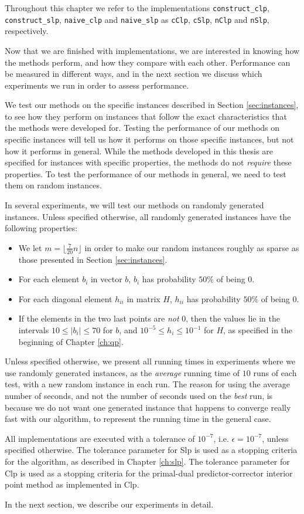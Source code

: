 Throughout this chapter we refer to the implementations \texttt{construct\_clp},
\texttt{construct\_slp}, \texttt{naive\_clp} and \texttt{naive\_slp} as
\texttt{cClp}, \texttt{cSlp}, \texttt{nClp} and \texttt{nSlp}, respectively.

Now that we are finished with implementations, we are interested in knowing
how the methods perform, and how they compare with each other.
Performance can be measured in different ways, and in the next section we
discuss which experiments we run in order to assess performance.

We test our methods on the specific instances described in
Section \ref{sec:instances}, to see how they perform on instances that follow
the exact characteristics that the methods were developed for.
Testing the performance of our methods on specific instances will tell us
how it performs on those specific instances, but not how it performs in general.
While the methods developed in this thesis are specified for instances with
specific properties, the methods do not \emph{require} these properties.
To test the performance of our methods in general, we need to test them
on random instances.

In several experiments, we will test our methods on randomly generated
instances.
Unless specified otherwise, all randomly generated instances have
the following properties:
\begin{itemize}
\item We let $m = \lfloor \frac{7}{20}n \rfloor$ in order to make our random
      instances roughly as sparse as those presented in Section
      \ref{sec:instances}.
\item For each element $b_i$ in vector $b$, $b_i$ has probability $50\%$ of being 0.
\item For each diagonal element $h_{ii}$ in matrix $H$, $h_{ii}$ has
      probability $50\%$ of being 0.
\item If the elements in the two last points are \emph{not} 0, then the values lie in
      the intervals $10 \leq |b_i| \leq 70$ for $b$, and
      $10^{-5} \leq h_i \leq 10^{-1}$ for $H$, as specified in the beginning of
      Chapter \ref{ch:qp}.
\end{itemize}

Unless specified otherwise, we present all running times in experiments where
we use randomly generated instances, as the \emph{average} running time of
$10$ runs of each test, with a new random instance in each run.
The reason for using the average number of seconds, and
not the number of seconds used on the \emph{best} run, is because we do not want
one generated instance that happens to converge really fast with our algorithm,
to represent the running time in the general case.

All implementations are executed with a tolerance of $10^{-7}$, i.e.
$\epsilon = 10^{-7}$, unless specified otherwise.
The tolerance parameter for Slp is used as a stopping criteria for
the algorithm, as described in Chapter \ref{ch:slp}.
The tolerance parameter for Clp is used as a stopping criteria
for the primal-dual predictor-corrector interior point method as implemented
in Clp.

In the next section, we describe our experiments in detail.

